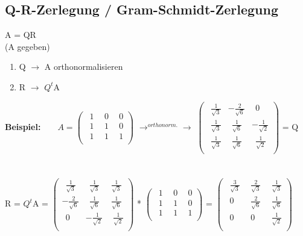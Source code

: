\subsection{Q-R-Zerlegung / Gram-Schmidt-Zerlegung}
	A = QR\\
	(A gegeben)
	\begin{enumerate}
		\item Q $\rightarrow$ A orthonormalisieren 
		\item R $\rightarrow$ $Q^t$A 
	\end{enumerate} 
	\textbf{Beispiel:}\ \ \ \  
	$A=	\left(\begin{array}{ccc}
		\ \ 1 &\ \ 0 &\ \ 0\\
		\ \ 1 &\ \ 1 &\ \ 0\\
		\ \ 1 &\ \ 1 &\ \ 1\\
	\end{array}\right)$
	$\rightarrow^{orthonorm.}\rightarrow$
	$\left(\begin{array}{ccc}
		\ \ \frac 1 {\sqrt 3}  & -\frac 2 {\sqrt 6} &\ \ 0\\
		\ \ \frac 1 {\sqrt 3} &\ \ \frac 1 {\sqrt 6} & -\frac 1 {\sqrt 2}\\
		\ \ \frac 1 {\sqrt 3} &\ \ \frac 1 {\sqrt 6} &\ \ \frac 1 {\sqrt 2}\\
	\end{array}\right)$ = Q\\\\\\
	R = $Q^t$A = 
	$\left(\begin{array}{ccc}
			\ \ \frac 1 {\sqrt 3}  &\ \ \frac 1 {\sqrt 3} &\ \frac 1 {\sqrt 3}\\
			 -\frac 2 {\sqrt 6} &\ \ \frac 1 {\sqrt 6} &\ \frac 1 {\sqrt 6}\\
			\ \ 0 & -\frac 1 {\sqrt 2} &\ \ \frac 1 {\sqrt 2}\\
		\end{array}\right)$ * 
	$\left(\begin{array}{ccc}
		\ \ 1 &\ \ 0 &\ \ 0\\
		\ \ 1 &\ \ 1 &\ \ 0\\
		\ \ 1 &\ \ 1 &\ \ 1\\
	\end{array}\right)$ =
	$\left(\begin{array}{ccc}
		\ \ \frac 3 {\sqrt 3} &\ \ \frac 2 {\sqrt 3} &\ \ \frac 1 {\sqrt 3}\\
		\ \ 0 &\ \ \frac 2 {\sqrt 6} &\ \ \frac 1 {\sqrt 6}\\
		\ \ 0 &\ \ 0 &\ \ \frac 1 {\sqrt 2}\\
	\end{array}\right)$

